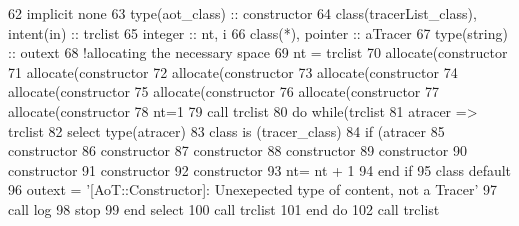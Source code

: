 \begin{DoxyCode}
62     \textcolor{keywordtype}{implicit none}
63     \textcolor{keywordtype}{type}(aot\_class) :: constructor
64     \textcolor{keywordtype}{class}(tracerList\_class), \textcolor{keywordtype}{intent(in)} :: trclist
65     \textcolor{keywordtype}{integer} :: nt, i
66     \textcolor{keywordtype}{class}(*), \textcolor{keywordtype}{pointer} :: aTracer
67     \textcolor{keywordtype}{type}(string) :: outext
68     \textcolor{comment}{!allocating the necessary space}
69     nt = trclist%
70     \textcolor{keyword}{allocate}(constructor%
71     \textcolor{keyword}{allocate}(constructor%
72     \textcolor{keyword}{allocate}(constructor%
73     \textcolor{keyword}{allocate}(constructor%
74     \textcolor{keyword}{allocate}(constructor%
75     \textcolor{keyword}{allocate}(constructor%
76     \textcolor{keyword}{allocate}(constructor%
77     \textcolor{keyword}{allocate}(constructor%
78     nt=1
79     \textcolor{keyword}{call }trclist%
80     \textcolor{keywordflow}{do} \textcolor{keywordflow}{while}(trclist%
81         atracer => trclist%
82         \textcolor{keywordflow}{select type}(atracer)
83 \textcolor{keywordflow}{        class is} (tracer\_class)
84             \textcolor{keywordflow}{if} (atracer%
85                 constructor%
86                 constructor%
87                 constructor%
88                 constructor%
89                 constructor%
90                 constructor%
91                 constructor%
92                 constructor%
93                 nt= nt + 1
94 \textcolor{keywordflow}{            end if}
95 \textcolor{keywordflow}{            class default}
96             outext = \textcolor{stringliteral}{'[AoT::Constructor]: Unexepected type of content, not a Tracer'}
97             \textcolor{keyword}{call }log%
98             stop
99 \textcolor{keywordflow}{        end select}
100         \textcolor{keyword}{call }trclist%
101 \textcolor{keywordflow}{    end do}
102     \textcolor{keyword}{call }trclist%
\end{DoxyCode}
\mbox{\label{namespaceaot__mod_aa6ef0ed7c67e66bf04e7aa0070bbde7f}} 
